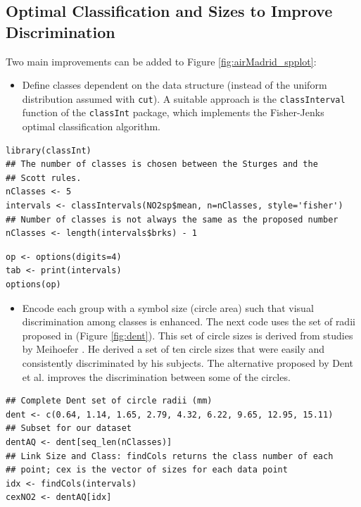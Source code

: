 \documentclass[smallroyalvopaper]{memoir}
\begin{document}
\subsection{Optimal Classification and Sizes to Improve Discrimination}
\label{sec-1-3}
Two main improvements can be added to Figure
\ref{fig:airMadrid_spplot}:

\begin{itemize}
\item Define classes dependent on the data structure (instead of the
uniform distribution assumed with \texttt{cut}). A suitable approach is
the \texttt{classInterval} function of the \texttt{classInt} package, which
implements the Fisher-Jenks optimal classification
algorithm.
\end{itemize}


\lstset{language=R,numbers=none}
\begin{lstlisting}
library(classInt)
## The number of classes is chosen between the Sturges and the
## Scott rules.
nClasses <- 5
intervals <- classIntervals(NO2sp$mean, n=nClasses, style='fisher')
## Number of classes is not always the same as the proposed number
nClasses <- length(intervals$brks) - 1
\end{lstlisting}

\lstset{language=R,numbers=none}
\begin{lstlisting}
op <- options(digits=4)
tab <- print(intervals)
options(op)
\end{lstlisting}

\begin{itemize}
\item Encode each group with a symbol size (circle area) such that visual
discrimination among classes is enhanced. The next code uses the set
of radii proposed in \cite{Dent.Torguson.ea2008} (Figure
\ref{fig:dent}). This set of circle sizes is derived from studies by Meihoefer \cite{Meihoefer1969}. He derived a set of ten
circle sizes that were easily and consistently discriminated by his
subjects. The alternative proposed by Dent et al. improves the
discrimination between some of the circles.
\end{itemize}

\lstset{language=R,numbers=none}
\begin{lstlisting}
## Complete Dent set of circle radii (mm)
dent <- c(0.64, 1.14, 1.65, 2.79, 4.32, 6.22, 9.65, 12.95, 15.11)
## Subset for our dataset
dentAQ <- dent[seq_len(nClasses)]
## Link Size and Class: findCols returns the class number of each
## point; cex is the vector of sizes for each data point
idx <- findCols(intervals)
cexNO2 <- dentAQ[idx]
\end{lstlisting}
\end{document}
